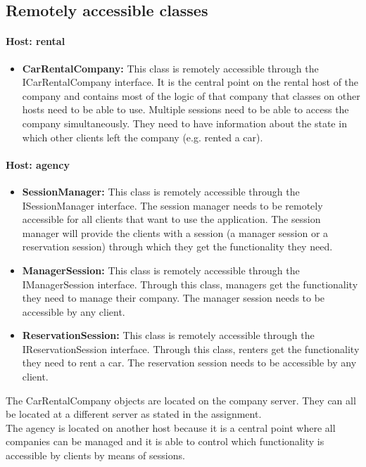 \documentclass[10pt,a4paper]{article}
\begin{document}
\subsection{Remotely accessible classes}


\paragraph{Host: rental}
\begin{itemize}
\item \textbf{CarRentalCompany:} This class is remotely accessible through the ICarRentalCompany interface. It is the central point on the rental host of the company and contains most of the logic of that company that classes on other hosts need to be able to use. Multiple sessions need to be able to access the company simultaneously. They need to have information about the state in which other clients left the company (e.g. rented a car).
\end{itemize}

\paragraph{Host: agency}
\begin{itemize}
\item \textbf{SessionManager:} This class is remotely accessible through the ISessionManager interface. The session manager needs to be remotely accessible for all clients that want to use the application. The session manager will provide the clients with a session (a manager session or a reservation session) through which they get the functionality they need.
\item \textbf{ManagerSession:} This class is remotely accessible through the IManagerSession interface. Through this class, managers get the functionality they need to manage their company. The manager session needs to be accessible by any client.
\item \textbf{ReservationSession:} This class is remotely accessible through the IReservationSession interface. Through this class, renters get the functionality they need to rent a car. The reservation session needs to be accessible by any client.
\end{itemize}

The CarRentalCompany objects are located on the company server. They can all be located at a different server as stated in the assignment.\\
The agency is located on another host because it is a central point where all companies can be managed and  it is able to control which functionality is accessible by clients by means of sessions.\\
\end{document}

